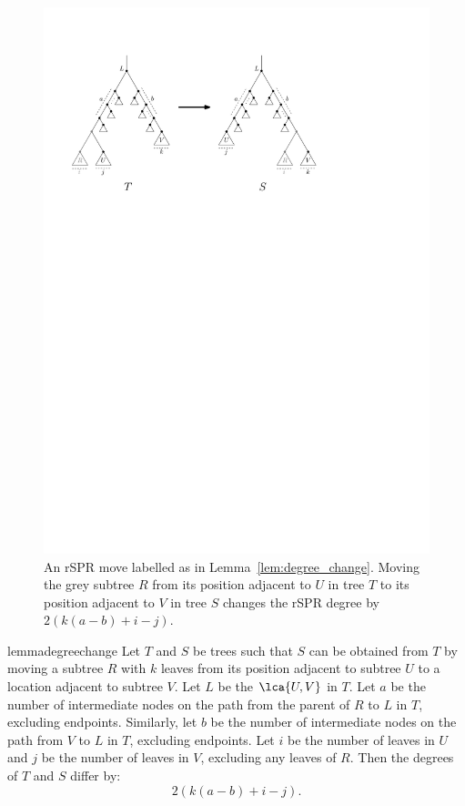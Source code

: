 \documentclass[11pt,onecolumn,conference]{IEEEtran}
\let\MYoriglatexcaption\caption
\renewcommand{\caption}[2][\relax]{\MYoriglatexcaption[#2]{#2}}
\begin{document}
\begin{figure}
	\includegraphics[width=\textwidth]{figs/spr-degree-change}
	\caption{An rSPR move labelled as in Lemma~\ref{lem:degree_change}.
Moving the grey subtree $R$ from its position adjacent to $U$ in tree $T$ to its position adjacent to $V$ in tree $S$ changes the rSPR degree by $2\left(k(a-b) + i - j\right)$.}
	\label{fig:spr-degree-change}
\end{figure}

\begin{restatable}{lemma}{degreechange}
\label{lem:degree_change}
Let $T$ and $S$ be trees such that $S$ can be obtained from $T$ by moving a subtree $R$ with $k$ leaves from its position adjacent to subtree $U$ to a location adjacent to subtree $V$.
Let $L$ be the $\lca{U,V}$ in $T$.
Let $a$ be the number of intermediate nodes on the path from the parent of $R$ to $L$ in $T$, excluding endpoints.
Similarly, let $b$ be the number of intermediate nodes on the path from $V$ to $L$ in $T$, excluding endpoints.
Let $i$ be the number of leaves in $U$ and $j$ be the number of leaves in $V$, excluding any leaves of $R$.
Then the degrees of $T$ and $S$ differ by:
$$2\left(k(a-b) + i - j\right).$$

\end{restatable}
\end{document}
